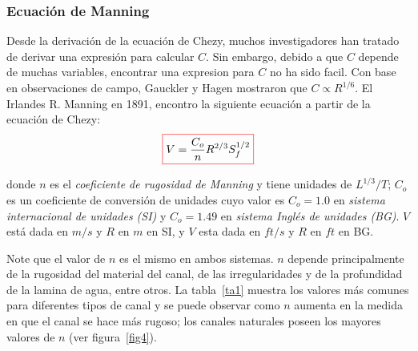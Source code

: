 \documentclass[11pt, oneside]{article}
\begin{document}
\subsubsection{Ecuaci\'on de Manning}
Desde la derivaci\'on de la ecuaci\'on de Chezy, muchos investigadores han tratado de derivar una expresi\'on para calcular $C$. Sin embargo, debido a que $C$ depende de muchas variables, encontrar una expresion para $C$ no ha sido facil. Con base en observaciones de campo, Gauckler y Hagen mostraron que $C \propto R^{1/6}$. El Irlandes R. Manning en 1891, encontro la siguiente ecuaci\'on a partir de la ecuaci\'on de Chezy:
\begin{equation}
\color{red}\boxed{\color{black} V = \frac{C_o }{n} R^{2/3} S_f^{1/2}}
\label{eq16}
\end{equation}

donde $n$ es el \emph{coeficiente de rugosidad de Manning} y tiene unidades de $L^{1/3} /T$; $C_o$ es un coeficiente de conversi\'on de unidades cuyo valor es $C_o = 1.0$ en \emph{sistema internacional de unidades (SI)} y $C_o = 1.49$ en \emph{sistema Ingl\'es de unidades (BG)}. $V$ est\'a dada en $m/s$ y $R$ en $m$ en SI, y $V$ esta dada en $ft/s$ y $R$ en $ft$ en BG.
 
Note que el valor de $n$ es el mismo en ambos sistemas. $n$ depende principalmente de la rugosidad del material del canal, de las irregularidades y de la profundidad de la lamina de agua, entre otros. La tabla~\ref{ta1} muestra los valores m\'as comunes para diferentes tipos de canal y se puede observar como $n$ aumenta en la medida en que el canal se hace m\'as rugoso; los canales naturales poseen los mayores valores de $n$ (ver figura~\ref{fig4}).   
\end{document}
